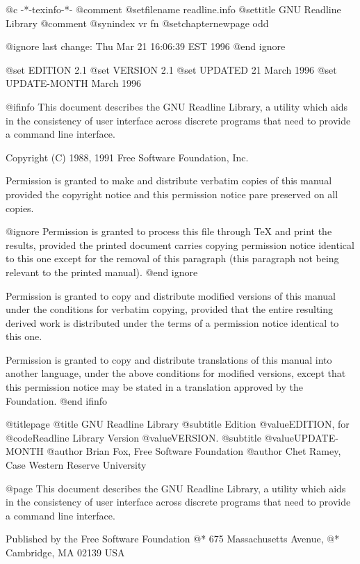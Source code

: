     @c -*-texinfo-*-
@comment %
@setfilename readline.info
@settitle GNU Readline Library
@comment %
@synindex vr fn
@setchapternewpage odd

@ignore
last change: Thu Mar 21 16:06:39 EST 1996
@end ignore

@set EDITION 2.1
@set VERSION 2.1
@set UPDATED 21 March 1996
@set UPDATE-MONTH March 1996

@ifinfo
This document describes the GNU Readline Library, a utility which aids
in the consistency of user interface across discrete programs that need
to provide a command line interface.

Copyright (C) 1988, 1991 Free Software Foundation, Inc.

Permission is granted to make and distribute verbatim copies of
this manual provided the copyright notice and this permission notice
pare preserved on all copies.

@ignore
Permission is granted to process this file through TeX and print the
results, provided the printed document carries copying permission
notice identical to this one except for the removal of this paragraph
(this paragraph not being relevant to the printed manual).
@end ignore

Permission is granted to copy and distribute modified versions of this
manual under the conditions for verbatim copying, provided that the entire
resulting derived work is distributed under the terms of a permission
notice identical to this one.

Permission is granted to copy and distribute translations of this manual
into another language, under the above conditions for modified versions,
except that this permission notice may be stated in a translation approved
by the Foundation.
@end ifinfo

@titlepage  
@title GNU Readline Library
@subtitle Edition @value{EDITION}, for @code{Readline Library} Version @value{VERSION}.
@subtitle @value{UPDATE-MONTH}
@author Brian Fox, Free Software Foundation
@author Chet Ramey, Case Western Reserve University

@page
This document describes the GNU Readline Library, a utility which aids
in the consistency of user interface across discrete programs that need
to provide a command line interface.

Published by the Free Software Foundation @*
675 Massachusetts Avenue, @*
Cambridge, MA 02139 USA

